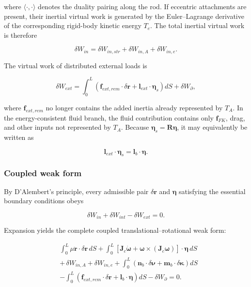 where \(\langle \cdot , \cdot \rangle\) denotes the duality pairing along the rod. If eccentric attachments are present, their inertial virtual work is generated by the Euler--Lagrange derivative of the corresponding rigid-body kinetic energy \(T_{e}\). The total inertial virtual work is therefore

\begin{equation}
\label{eq:rod-1-87}
\delta W_{in} = \delta W_{in,str} + \delta W_{in,A} + \delta W_{in,e}.
\end{equation}

The virtual work of distributed external loads is

\begin{equation}
\label{eq:rod-1-88}
\delta W_{ext} = \int_{0}^{L}\left( \mathbf{f}_{ext,rem} \cdot \delta\mathbf{r} + \mathbf{l}_{ext} \cdot \bm{\eta}_{s} \right)dS + \delta W_{\partial},
\end{equation}

where \(\mathbf{f}_{ext,rem}\) no longer contains the added inertia already represented by \(T_{A}\). In the energy-consistent fluid branch, the fluid contribution contains only \(\mathbf{f}_{FK}\), drag, and other inputs not represented by \(T_{A}\). Because \(\bm{\eta}_{s} = \mathbf{R}\bm{\eta}\), it may equivalently be written as

\begin{equation}
\label{eq:rod-1-89}
\mathbf{l}_{ext} \cdot \bm{\eta}_{s} = \mathbf{l}_{b} \cdot \bm{\eta}.
\end{equation}

\subsubsection{Coupled weak form}\label{sec:rod-1-5-4}

By D'Alembert's principle, every admissible pair \(\delta\mathbf{r}\) and \(\bm{\eta}\) satisfying the essential boundary conditions obeys

\begin{equation}
\label{eq:rod-1-90}
\delta W_{in} + \delta W_{int} - \delta W_{ext} = 0.
\end{equation}

Expansion yields the complete coupled translational--rotational weak form:

\begin{equation}
\label{eq:rod-1-91}
\begin{matrix}
 & \int_{0}^{L}\mu\ddot{\mathbf{r}} \cdot \delta\mathbf{r}\, dS + \int_{0}^{L}\left\lbrack \mathbf{J}_{c}\dot{\bm{\omega}} + \bm{\omega} \times \left( \mathbf{J}_{c}\bm{\omega} \right) \right\rbrack \cdot \bm{\eta}\, dS \\
 & + \,\delta W_{in,A} + \delta W_{in,e} + \int_{0}^{L}\left( \mathbf{n}_{b} \cdot \delta\bm{\nu} + \mathbf{m}_{b} \cdot \delta\bm{\kappa} \right)dS \\
 & - \int_{0}^{L}\left( \mathbf{f}_{ext,rem} \cdot \delta\mathbf{r} + \mathbf{l}_{b} \cdot \bm{\eta} \right)dS - \delta W_{\partial} = 0.
\end{matrix}
\end{equation}

